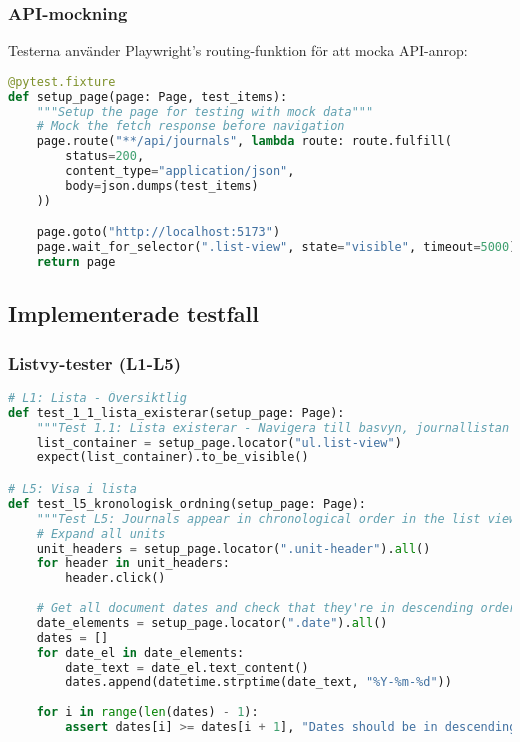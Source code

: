 \subsubsection{API-mockning}
Testerna använder Playwright's routing-funktion för att mocka API-anrop:

\begin{lstlisting}[language=python]
@pytest.fixture
def setup_page(page: Page, test_items):
    """Setup the page for testing with mock data"""
    # Mock the fetch response before navigation
    page.route("**/api/journals", lambda route: route.fulfill(
        status=200,
        content_type="application/json",
        body=json.dumps(test_items)
    ))

    page.goto("http://localhost:5173")
    page.wait_for_selector(".list-view", state="visible", timeout=5000)
    return page
\end{lstlisting}

\subsection{Implementerade testfall}

\subsubsection{Listvy-tester (L1-L5)}

\begin{lstlisting}[language=python]
# L1: Lista - Översiktlig
def test_1_1_lista_existerar(setup_page: Page):
    """Test 1.1: Lista existerar - Navigera till basvyn, journallistan renderas och är synlig"""
    list_container = setup_page.locator("ul.list-view")
    expect(list_container).to_be_visible()

# L5: Visa i lista
def test_l5_kronologisk_ordning(setup_page: Page):
    """Test L5: Journals appear in chronological order in the list view"""
    # Expand all units
    unit_headers = setup_page.locator(".unit-header").all()
    for header in unit_headers:
        header.click()
    
    # Get all document dates and check that they're in descending order
    date_elements = setup_page.locator(".date").all()
    dates = []
    for date_el in date_elements:
        date_text = date_el.text_content()
        dates.append(datetime.strptime(date_text, "%Y-%m-%d"))
    
    for i in range(len(dates) - 1):
        assert dates[i] >= dates[i + 1], "Dates should be in descending order"
\end{lstlisting}

